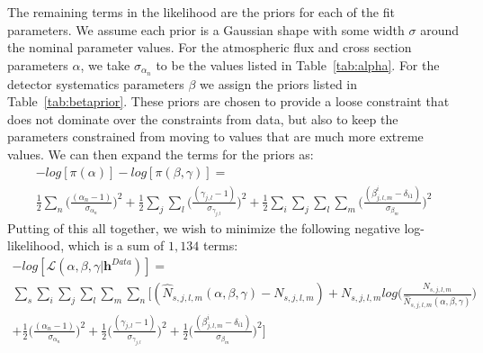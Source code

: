 The remaining terms in the likelihood are the priors for each of the fit
parameters.  We assume each prior is a Gaussian shape with some width
$\sigma$ around the nominal parameter values.  For the atmospheric flux and
cross section parameters $\alpha$, we take $\sigma_{\alpha_{n}}$ to be the
values listed in Table~\ref{tab:alpha}.  For the detector systematics
parameters $\beta$ we assign the priors listed in Table~\ref{tab:betaprior}.
These priors are chosen to provide a loose constraint that does not dominate
over the constraints from data, but also to keep the parameters constrained
from moving to values that are much more extreme values.  We can then expand
the terms for the priors as:
%
\begin{gather*}
  \label{eq:logpriors}
  - log[\pi(\alpha)] - log[\pi(\beta,\gamma)] = \\ \frac{1}{2}
  \sum\limits_{n}^{} \bigg(\frac{(\alpha_{n} - 1)}{\sigma_{\alpha_{n}}}\bigg)^{2} +
   \frac{1}{2} \sum\limits_{j}^{} \sum\limits_{l}^{} 
  \bigg(\frac{(\gamma_{j,l} - 1)}{\sigma_{\gamma_{j,l}}}\bigg)^{2} + 
   \frac{1}{2} \sum\limits_{i}^{} \sum\limits_{j}^{} \sum\limits_{l}^{} \sum\limits_{m}^{}
  \bigg(\frac{(\beta_{j,l,m}^{i} - \delta_{i1})}{\sigma_{\beta_{m}}}\bigg)^{2}  
\end{gather*}
%
Putting of this all together, we wish to minimize the following negative log-likelihood, which is a
sum of $1,134$ terms:
%
\begin{equation}
 \begin{gathered}
  -log[\mathcal{L}(\alpha,\beta,\gamma | \mathbf{h}^{Data}  )] = \\
  \sum\limits_{s}^{} \sum\limits_{i}^{}  \sum\limits_{j}^{} \sum\limits_{l}^{} \sum\limits_{m}^{} \sum\limits_{n}^{}
  \bigg[ (\hat{N}_{s,j,l,m}(\alpha,\beta,\gamma) - N_{s,j,l,m})
    + N_{s,j,l,m}log\bigg(\frac{N_{s,j,l,m}}{\hat{N}_{s,j,l,m}(\alpha,\beta,\gamma)}\bigg) \\
  + \frac{1}{2}\bigg(\frac{(\alpha_{n} - 1)}{\sigma_{\alpha_{n}}}\bigg)^{2}
  + \frac{1}{2}\bigg(\frac{(\gamma_{j,l} - 1)}{\sigma_{\gamma_{j,l}}}\bigg)^{2} 
  + \frac{1}{2}\bigg(\frac{(\beta_{j,l,m}^{i} - \delta_{i1})}{\sigma_{\beta_{m}}}\bigg)^{2} \bigg] 
 \end{gathered}
 \label{eq:likefull}
\end{equation}


